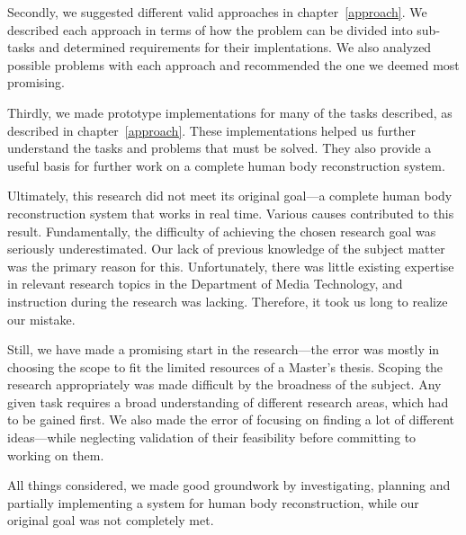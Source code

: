 Secondly, we suggested different valid approaches in chapter~\ref{approach}. We described each approach in terms of how the problem can be divided into sub-tasks and determined requirements for their implentations. We also analyzed possible problems with each approach and recommended the one we deemed most promising.

Thirdly, we made prototype implementations for many of the tasks described, as described in chapter~\ref{approach}. These implementations helped us further understand the tasks and problems that must be solved. They also provide a useful basis for further work on a complete human body reconstruction system.

\newtopic

Ultimately, this research did not meet its original goal---a complete human body reconstruction system that works in real time. Various causes contributed to this result. Fundamentally, the difficulty of achieving the chosen research goal was seriously underestimated. Our lack of previous knowledge of the subject matter was the primary reason for this. Unfortunately, there was little existing expertise in relevant research topics in the Department of Media Technology, and instruction during the research was lacking. Therefore, it took us long to realize our mistake.

Still, we have made a promising start in the research---the error was mostly in choosing the scope to fit the limited resources of a Master's thesis. Scoping the research appropriately was made difficult by the broadness of the subject. Any given task requires a broad understanding of different research areas, which had to be gained first. We also made the error of focusing on finding a lot of different ideas---while neglecting validation of their feasibility before committing to working on them.

All things considered, we made good groundwork by investigating, planning and partially implementing a system for human body reconstruction, while our original goal was not completely met.
